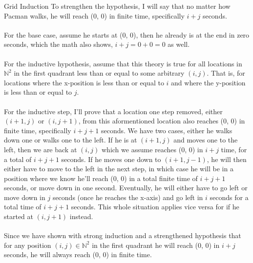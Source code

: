 \begin{homeworkProblem}{Grid Induction}
    To strengthen the hypothesis, I will say that no matter how Pacman walks, he will reach (0, 0) in finite time, specifically $i+j$ seconds. 
    \\ \\
    For the base case, assume he starts at (0, 0), then he already is at the end in zero seconds, which the math also shows, $i+j=0+0=0$ as well.
    \\ \\
    For the inductive hypothesis, assume that this theory is true for all locations in $\mathbb{N}^2$ in the first quadrant less than or equal to some arbitrary $(i, j)$. That is, for locations where the x-position is less than or equal to $i$ and where the y-position is less than or equal to $j$.
    \\ \\
    For the inductive step, I'll prove that a location one step removed, either $(i+1, j)$ or $(i, j+1)$, from this aformentioned location also reaches (0, 0) in finite time, specifically $i+j+1$ seconds. We have two cases, either he walks down one or walks one to the left. If he is at $(i+1, j)$ and moves one to the left, then we are back at $(i, j)$ which we assume reaches (0, 0) in $i+j$ time, for a total of $i+j+1$ seconds. If he moves one down to $(i +1, j-1)$, he will then either have to move to the left in the next step, in which case he will be in a position where we know he'll reach (0, 0) in a total finite time of $i+j+1$ seconds, or move down in one second. Eventually, he will either have to go left or move down in $j$ seconds (once he reaches the x-axis) and go left in $i$ seconds for a total time of $i+j+1$ seconds. This whole situation applies vice versa for if he started at $(i, j+1)$ instead. 
    \\ \\
    Since we have shown with strong induction and a strengthened hypothesis that for any position $(i, j) \in \mathbb{N}^2$ in the first quadrant he will reach (0, 0) in $i+j$ seconds, he will always reach (0, 0) in finite time. 
    
    
\end{homeworkProblem}